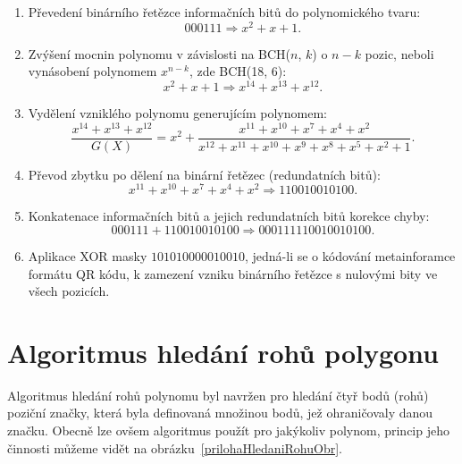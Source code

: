 \begin{enumerate}
  \item Převedení binárního řetězce informačních bitů do polynomického tvaru:
	\begin{equation}
	  000111 \Rightarrow x^2 + x + 1\mbox{.}
	\end{equation}
  \item Zvýšení mocnin polynomu v závislosti na BCH($n$, $k$) o $n - k$ pozic,
  neboli vynásobení polynomem $x^{n-k}$, zde BCH(18, 6):
	\begin{equation}
	  x^2 + x + 1 \Rightarrow x^{14} + x^{13} + x^{12}\mbox{.}
	\end{equation}
  \item Vydělení vzniklého polynomu generujícím polynomem:
	\begin{equation}
	  \frac{x^{14} + x^{13} + x^{12}}{G(X)} =  x^2 + \frac{x^{11} + x^{10} + x^7 +
	  x^4 +x^2}{x^{12} + x^{11} + x^{10} + x^9 + x^8 + x^5 + x^2 + 1}\mbox{.}
	\end{equation}
  \item Převod zbytku po dělení na binární řetězec (redundatních bitů):
	\begin{equation}
      x^{11} + x^{10} + x^7 + x^4 +x^2 \Rightarrow 110010010100\mbox{.}
	\end{equation}
  \item Konkatenace informačních bitů a jejich redundatních bitů korekce chyby:
	\begin{equation}
      000111 + 110010010100 \Rightarrow 000111110010010100\mbox{.}
	\end{equation}
  \item Aplikace XOR masky $101010000010010$, jedná-li se o kódování
  metainforamce formátu QR kódu, k zamezení vzniku binárního řetězce s
  nulovými bity ve všech pozicích.
\end{enumerate}

\chapter{Algoritmus hledání rohů polygonu}
\label{algoritmusHledaniRohu}

Algoritmus hledání rohů polynomu byl navržen pro hledání čtyř bodů (rohů)
poziční značky, která byla definovaná množinou bodů, jež ohraničovaly danou
značku. Obecně lze ovšem algoritmus použít pro jakýkoliv polynom, princip jeho
činnosti můžeme vidět na obrázku~\ref{prilohaHledaniRohuObr}.

